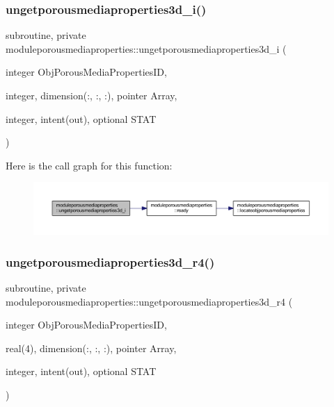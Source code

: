\subsubsection{\texorpdfstring{ungetporousmediaproperties3d\+\_\+i()}{ungetporousmediaproperties3d\_i()}}
{\footnotesize\ttfamily subroutine, private moduleporousmediaproperties\+::ungetporousmediaproperties3d\+\_\+i (\begin{DoxyParamCaption}\item[{integer}]{Obj\+Porous\+Media\+Properties\+ID,  }\item[{integer, dimension(\+:, \+:, \+:), pointer}]{Array,  }\item[{integer, intent(out), optional}]{S\+T\+AT }\end{DoxyParamCaption})\hspace{0.3cm}{\ttfamily [private]}}

Here is the call graph for this function\+:\nopagebreak
\begin{figure}[H]
\begin{center}
\leavevmode
\includegraphics[width=350pt]{namespacemoduleporousmediaproperties_a08471307dc61da0cc694bc4e7b47b840_cgraph}
\end{center}
\end{figure}
\mbox{\label{namespacemoduleporousmediaproperties_ae5667c60b268b4c99e403dc08b831ee5}} 
\subsubsection{\texorpdfstring{ungetporousmediaproperties3d\+\_\+r4()}{ungetporousmediaproperties3d\_r4()}}
{\footnotesize\ttfamily subroutine, private moduleporousmediaproperties\+::ungetporousmediaproperties3d\+\_\+r4 (\begin{DoxyParamCaption}\item[{integer}]{Obj\+Porous\+Media\+Properties\+ID,  }\item[{real(4), dimension(\+:, \+:, \+:), pointer}]{Array,  }\item[{integer, intent(out), optional}]{S\+T\+AT }\end{DoxyParamCaption})\hspace{0.3cm}{\ttfamily [private]}}

